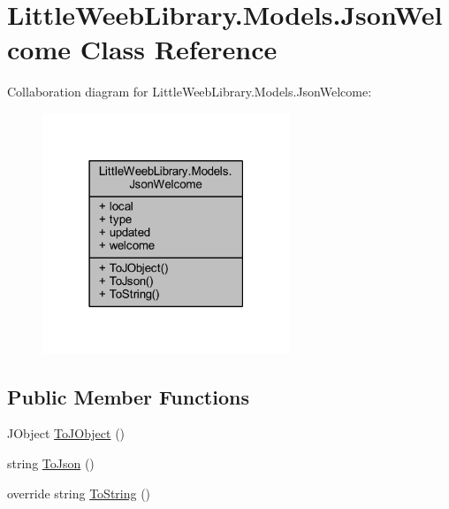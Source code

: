 \hypertarget{class_little_weeb_library_1_1_models_1_1_json_welcome}{}\section{Little\+Weeb\+Library.\+Models.\+Json\+Welcome Class Reference}
\label{class_little_weeb_library_1_1_models_1_1_json_welcome}


Collaboration diagram for Little\+Weeb\+Library.\+Models.\+Json\+Welcome\+:\nopagebreak
\begin{figure}[H]
\begin{center}
\leavevmode
\includegraphics[width=210pt]{class_little_weeb_library_1_1_models_1_1_json_welcome__coll__graph}
\end{center}
\end{figure}
\subsection*{Public Member Functions}
\begin{DoxyCompactItemize}
\item 
J\+Object \mbox{\hyperlink{class_little_weeb_library_1_1_models_1_1_json_welcome_a964f2548a650181c962a0cf9027ba119}{To\+J\+Object}} ()
\item 
string \mbox{\hyperlink{class_little_weeb_library_1_1_models_1_1_json_welcome_a5b3e7dadb2a342808c714b6277a9150d}{To\+Json}} ()
\item 
override string \mbox{\hyperlink{class_little_weeb_library_1_1_models_1_1_json_welcome_a762f38491c69ca0d0c2c17e4582a145c}{To\+String}} ()
\end{DoxyCompactItemize}
